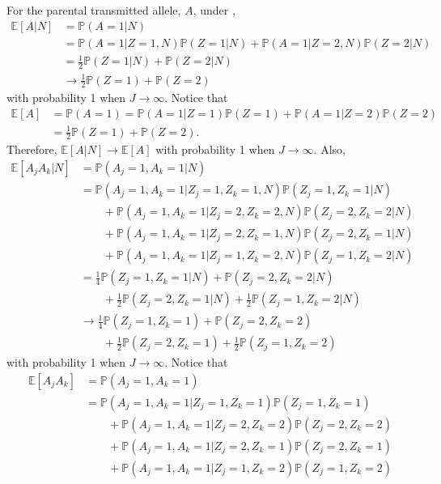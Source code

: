 \documentclass[12pt]{extarticle}
\newcommand{\pp}{\mathbb{P}}
\newcommand{\E}{\mathbb{E}}
\newcommand{\nind}{J}
\begin{document}
{For the parental transmitted allele, $A$, under , 
\begin{align*}\E[A|N] &= \pp(A=1|N) \nonumber \\
&= \pp(A=1|Z=1,N)\pp(Z=1|N) + \pp(A=1|Z=2,N)\pp(Z=2|N) \nonumber \\
&= \frac{1}{2}\pp(Z=1|N) + \pp(Z=2|N) \nonumber \\
&\to \frac{1}{2}\pp(Z=1) + \pp(Z=2)
\end{align*} with probability 1 when $\nind \to \infty$. Notice that 
\begin{align} 
\E[A] &= \pp(A=1) = \pp(A=1|Z=1)\pp(Z=1) + \pp(A=1|Z=2)\pp(Z=2) \nonumber \\
&= \frac{1}{2}\pp(Z=1) + \pp(Z=2). \tag{A7.a} \label{eq:d1}
\end{align} 
Therefore, $\E[A|N] \to \E[A]$ with probability 1 when $\nind \to \infty$. Also, 
{\allowdisplaybreaks 
\begin{align*}
\E[A_jA_k|N] &= \pp(A_j=1,A_k=1|N) \nonumber \\
&= \pp(A_j=1,A_k=1|Z_j=1,Z_k=1,N)\pp(Z_j=1,Z_k=1|N) \nonumber \\
& \qquad + \pp(A_j=1,A_k=1|Z_j=2,Z_k=2,N)\pp(Z_j=2,Z_k=2|N) \nonumber \\
& \qquad + \pp(A_j=1,A_k=1|Z_j=2,Z_k=1,N)\pp(Z_j=2,Z_k=1|N) \nonumber \\
& \qquad + \pp(A_j=1,A_k=1|Z_j=1,Z_k=2,N)\pp(Z_j=1,Z_k=2|N) \nonumber \\
&= \frac{1}{4}\pp(Z_j=1,Z_k=1|N) + \pp(Z_j=2,Z_k=2|N) \nonumber \\
& \qquad + \frac{1}{2}\pp(Z_j=2,Z_k=1|N) + \frac{1}{2}\pp(Z_j=1,Z_k=2|N) \nonumber \\
&\to  \frac{1}{4}\pp(Z_j=1,Z_k=1) + \pp(Z_j=2,Z_k=2) \nonumber \\
& \qquad + \frac{1}{2}\pp(Z_j=2,Z_k=1) + \frac{1}{2}\pp(Z_j=1,Z_k=2)
\end{align*}}with probability 1 when $\nind \to \infty$. Notice that 
{\allowdisplaybreaks 
\begin{align}
\E[A_jA_k] &= \pp(A_j=1,A_k=1) \nonumber \\
&= \pp(A_j=1,A_k=1|Z_j=1,Z_k=1)\pp(Z_j=1,Z_k=1) \nonumber \\
& \qquad + \pp(A_j=1,A_k=1|Z_j=2,Z_k=2)\pp(Z_j=2,Z_k=2) \nonumber \\
& \qquad + \pp(A_j=1,A_k=1|Z_j=2,Z_k=1)\pp(Z_j=2,Z_k=1) \nonumber \\
& \qquad + \pp(A_j=1,A_k=1|Z_j=1,Z_k=2)\pp(Z_j=1,Z_k=2) \nonumber \\

\end{align}}}
\end{document}
